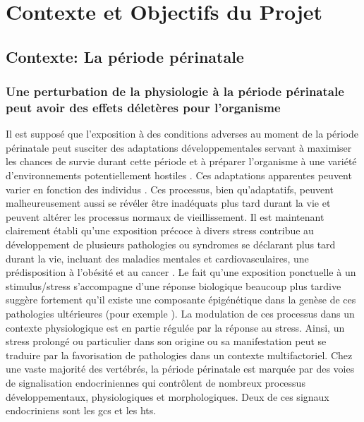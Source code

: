 \documentclass[../main.tex]{subfiles}
\begin{document}
\chapter{Contexte et Objectifs du Projet}




\section{Contexte: La période périnatale}


\subsection{Une perturbation de la physiologie à la période périnatale peut avoir des effets déletères pour l'organisme}

Il est supposé que l'exposition à des conditions adverses au moment de la période périnatale peut susciter des adaptations développementales servant à maximiser les chances de survie durant cette période et à préparer l'organisme à une variété d'environnements potentiellement hostiles \citep{Angelier2013,Crespi2013,Patterson2014}.
Ces adaptations apparentes peuvent varier en fonction des individus \citep{Cockrem2013}.
Ces processus, bien qu'adaptatifs, peuvent malheureusement aussi se révéler être inadéquats plus tard durant la vie et peuvent altérer les processus normaux de vieillissement.
Il est maintenant clairement établi qu'une exposition précoce à divers stress contribue au développement de plusieurs pathologies ou syndromes se déclarant plus tard durant la vie, incluant des maladies mentales et cardiovasculaires, une prédisposition à l'obésité et au cancer \citep{Braun2013,Harris2011,Plagemann2006,Challis2000,Davis2013,Barnes2011}.
Le fait qu'une exposition ponctuelle à un stimulus/stress s'accompagne d'une réponse biologique beaucoup plus tardive suggère fortement qu'il existe une composante épigénétique dans la genèse de ces pathologies ultérieures (pour exemple \citealp{Weaver2004,Begum2013,Crudo2012,Drake2012}).
La modulation de ces processus dans un contexte physiologique est en partie régulée par la réponse au stress.
Ainsi, un stress prolongé ou particulier dans son origine ou sa manifestation peut se traduire par la favorisation de pathologies dans un contexte multifactoriel.
Chez une vaste majorité des vertébrés, la période périnatale est marquée par des voies de signalisation endocriniennes qui contrôlent de nombreux processus développementaux, physiologiques et morphologiques.
Deux de ces signaux endocriniens sont les \glspl{gc} et les \glspl{ht}.
\end{document}
